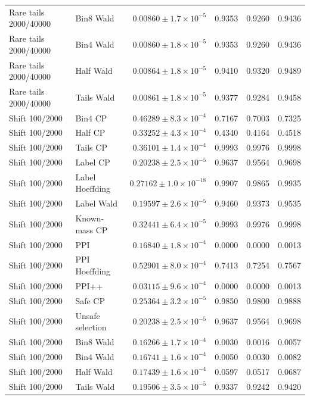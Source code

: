 \begin{longtable}{llrrrr}
Rare tails 2000/40000 & Bin8 Wald & $0.00860\pm 1.7\times 10^{-5}$ & 0.9353 & 0.9260 & 0.9436 \\
Rare tails 2000/40000 & Bin4 Wald & $0.00860\pm 1.8\times 10^{-5}$ & 0.9353 & 0.9260 & 0.9436 \\
Rare tails 2000/40000 & Half Wald & $0.00864\pm 1.8\times 10^{-5}$ & 0.9410 & 0.9320 & 0.9489 \\
Rare tails 2000/40000 & Tails Wald & $0.00861\pm 1.8\times 10^{-5}$ & 0.9377 & 0.9284 & 0.9458 \\
Shift 100/2000 & Bin4 CP & $0.46289\pm 8.3\times 10^{-4}$ & 0.7167 & 0.7003 & 0.7325 \\
Shift 100/2000 & Half CP & $0.33252\pm 4.3\times 10^{-4}$ & 0.4340 & 0.4164 & 0.4518 \\
Shift 100/2000 & Tails CP & $0.36101\pm 1.4\times 10^{-4}$ & 0.9993 & 0.9976 & 0.9998 \\
Shift 100/2000 & Label CP & $0.20238\pm 2.5\times 10^{-5}$ & 0.9637 & 0.9564 & 0.9698 \\
Shift 100/2000 & Label Hoeffding & $0.27162\pm 1.0\times 10^{-18}$ & 0.9907 & 0.9865 & 0.9935 \\
Shift 100/2000 & Label Wald & $0.19597\pm 2.6\times 10^{-5}$ & 0.9460 & 0.9373 & 0.9535 \\
Shift 100/2000 & Known-mass CP & $0.32441\pm 6.4\times 10^{-5}$ & 0.9993 & 0.9976 & 0.9998 \\
Shift 100/2000 & PPI & $0.16840\pm 1.8\times 10^{-4}$ & 0.0000 & 0.0000 & 0.0013 \\
Shift 100/2000 & PPI Hoeffding & $0.52901\pm 8.0\times 10^{-4}$ & 0.7413 & 0.7254 & 0.7567 \\
Shift 100/2000 & PPI++ & $0.03115\pm 9.6\times 10^{-4}$ & 0.0000 & 0.0000 & 0.0013 \\
Shift 100/2000 & Safe CP & $0.25364\pm 3.2\times 10^{-5}$ & 0.9850 & 0.9800 & 0.9888 \\
Shift 100/2000 & Unsafe selection & $0.20238\pm 2.5\times 10^{-5}$ & 0.9637 & 0.9564 & 0.9698 \\
Shift 100/2000 & Bin8 Wald & $0.16266\pm 1.7\times 10^{-4}$ & 0.0030 & 0.0016 & 0.0057 \\
Shift 100/2000 & Bin4 Wald & $0.16741\pm 1.6\times 10^{-4}$ & 0.0050 & 0.0030 & 0.0082 \\
Shift 100/2000 & Half Wald & $0.17439\pm 1.6\times 10^{-4}$ & 0.0597 & 0.0517 & 0.0687 \\
Shift 100/2000 & Tails Wald & $0.19506\pm 3.5\times 10^{-5}$ & 0.9337 & 0.9242 & 0.9420 \\

\end{longtable}
